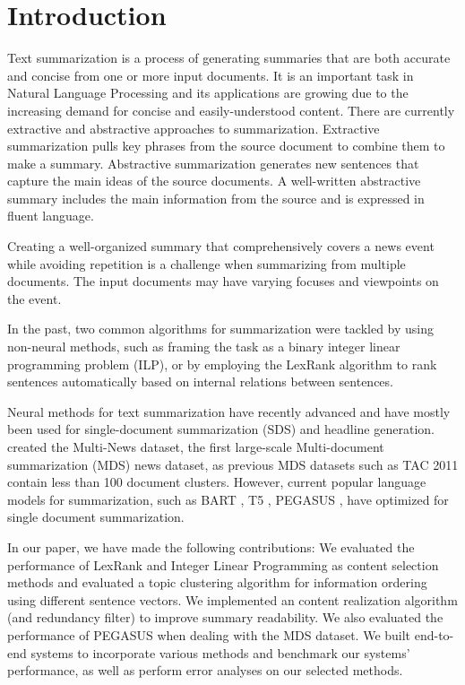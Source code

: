 
\section{Introduction}

Text summarization is a process of generating summaries that are both accurate and concise from one or more input documents. It is an important task in Natural Language Processing and its applications are growing due to the increasing demand for concise and easily-understood content. There are currently extractive and abstractive approaches to summarization. Extractive summarization pulls key phrases from the source document to combine them to make a summary. Abstractive summarization generates new sentences that capture the main ideas of the source documents. A well-written abstractive summary includes the main information from the source and is expressed in fluent language.

Creating a well-organized summary that comprehensively covers a news event while avoiding repetition is a challenge when summarizing from multiple documents. The input documents may have varying focuses and viewpoints on the event. 

In the past, two common algorithms for summarization were tackled by using non-neural methods, such as framing the task as a binary integer linear programming problem (ILP), or by employing the LexRank algorithm to rank sentences automatically based on internal relations between sentences.

Neural methods for text summarization have recently advanced and have mostly been used for single-document summarization (SDS) and headline generation. \citet{multinews} created the Multi-News dataset, the first large-scale Multi-document summarization (MDS) news dataset, as previous MDS datasets such as TAC 2011 \cite{tac2011} contain less than 100 document clusters. However, current popular language models for summarization, such as BART \cite{bart}, T5 \cite{t5}, PEGASUS \cite{pegasus}, have optimized for single document summarization.

In our paper, we have made the following contributions: We evaluated the performance of LexRank and Integer Linear Programming as content selection methods and evaluated a topic clustering algorithm for information ordering using different sentence vectors. We implemented an content realization algorithm (and redundancy filter) to improve summary readability. We also evaluated the performance of PEGASUS when dealing with the MDS dataset. We built end-to-end systems to incorporate various methods and benchmark our systems' performance, as well as perform error analyses on our selected methods.